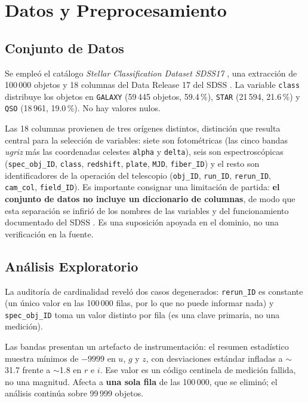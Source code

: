 \documentclass[10pt,journal]{IEEEtran}
\begin{document}
  \section{Datos y Preprocesamiento}

  \subsection{Conjunto de Datos}

  Se emple\'o el cat\'alogo \emph{Stellar Classification Dataset SDSS17} \cite{kaggle_sdss_dataset}, una extracci\'on de 100\,000 objetos y 18 columnas del Data Release 17 del SDSS \cite{abdurrouf2022}. La variable \texttt{class} distribuye los objetos en \texttt{GALAXY} (59\,445 objetos, 59.4\,\%), \texttt{STAR} (21\,594, 21.6\,\%) y \texttt{QSO} (18\,961, 19.0\,\%). No hay valores nulos.

  Las 18 columnas provienen de tres or\'igenes distintos, distinci\'on que resulta central para la selecci\'on de variables: siete son fotom\'etricas (las cinco bandas \emph{ugriz} m\'as las coordenadas celestes \texttt{alpha} y \texttt{delta}), seis son espectrosc\'opicas (\texttt{spec\_obj\_ID}, \texttt{class}, \texttt{redshift}, \texttt{plate}, \texttt{MJD}, \texttt{fiber\_ID}) y el resto son identificadores de la operaci\'on del telescopio (\texttt{obj\_ID}, \texttt{run\_ID}, \texttt{rerun\_ID}, \texttt{cam\_col}, \texttt{field\_ID}). Es importante consignar una limitaci\'on de partida: \textbf{el conjunto de datos no incluye un diccionario de columnas}, de modo que esta separaci\'on se infiri\'o de los nombres de las variables y del funcionamiento documentado del SDSS \cite{sdss_dr17_columns}. Es una suposici\'on apoyada en el dominio, no una verificaci\'on en la fuente.

  \subsection{An\'alisis Exploratorio}

  La auditor\'ia de cardinalidad revel\'o dos casos degenerados: \texttt{rerun\_ID} es constante (un \'unico valor en las 100\,000 filas, por lo que no puede informar nada) y \texttt{spec\_obj\_ID} toma un valor distinto por fila (es una clave primaria, no una medici\'on).

  Las bandas presentan un artefacto de instrumentaci\'on: el resumen estad\'istico muestra m\'inimos de $-9999$ en $u$, $g$ y $z$, con desviaciones est\'andar infladas a $\sim$31.7 frente a $\sim$1.8 en $r$ e $i$. Ese valor es un c\'odigo centinela de medici\'on fallida, no una magnitud. Afecta a \textbf{una sola fila} de las 100\,000, que se elimin\'o; el an\'alisis contin\'ua sobre 99\,999 objetos.
\end{document}
